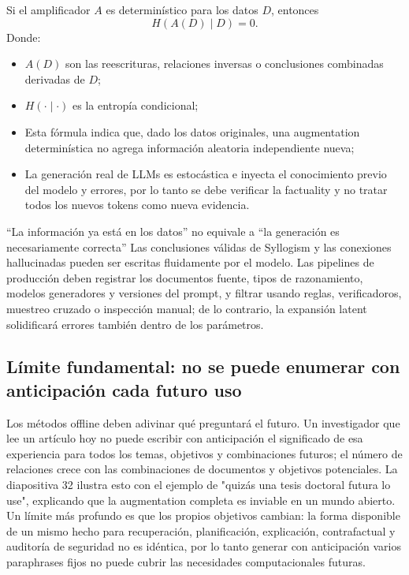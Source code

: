 

Si el amplificador $A$ es determinístico para los datos $D$, entonces
$$
H\!\left(A(D)\mid D\right)=0.
$$
Donde:
\begin{itemize}
  \item $A(D)$ son las reescrituras, relaciones inversas o conclusiones combinadas derivadas de $D$;
  \item $H(\cdot\mid\cdot)$ es la entropía condicional;
  \item Esta fórmula indica que, dado los datos originales, una augmentation determinística no agrega información aleatoria independiente nueva;
  \item La generación real de LLMs es estocástica e inyecta el conocimiento previo del modelo y errores, por lo tanto se debe verificar la factuality y no tratar todos los nuevos tokens como nueva evidencia.
\end{itemize}

\begin{warningbox}{“La información ya está en los datos” no equivale a “la generación es necesariamente correcta”}
Las conclusiones válidas de Syllogism y las conexiones hallucinadas pueden ser escritas fluidamente por el modelo. Las pipelines de producción deben registrar los documentos fuente, tipos de razonamiento, modelos generadores y versiones del prompt, y filtrar usando reglas, verificadoros, muestreo cruzado o inspección manual; de lo contrario, la expansión latent solidificará errores también dentro de los parámetros.
\end{warningbox}

\subsection{Límite fundamental: no se puede enumerar con anticipación cada futuro uso}

Los métodos offline deben adivinar qué preguntará el futuro. Un investigador que lee un artículo hoy no puede escribir con anticipación el significado de esa experiencia para todos los temas, objetivos y combinaciones futuros; el número de relaciones crece con las combinaciones de documentos y objetivos potenciales. La diapositiva 32 ilustra esto con el ejemplo de "quizás una tesis doctoral futura lo use", explicando que la augmentation completa es inviable en un mundo abierto. Un límite más profundo es que los propios objetivos cambian: la forma disponible de un mismo hecho para recuperación, planificación, explicación, contrafactual y auditoría de seguridad no es idéntica, por lo tanto generar con anticipación varios paraphrases fijos no puede cubrir las necesidades computacionales futuras.

